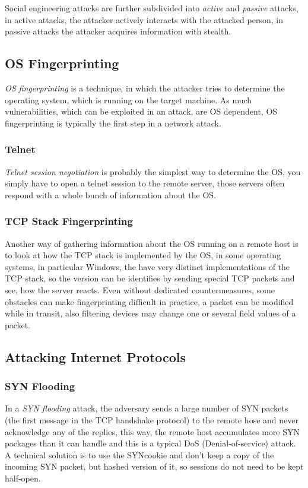 \documentclass[a4paper, 10 pt, conference]{ieeeconf}
\begin{document}
Social engineering attacks are further subdivided into \emph{active } and \emph{passive} attacks, in active attacks, the attacker actively interacts with the attacked person, in passive attacks the attacker acquires information with stealth.
\subsection{\textbf{OS Fingerprinting}}
\emph{OS fingerprinting} is a technique, in which the attacker tries to determine the operating system, which is running on the target machine. As much vulnerabilities, which can be exploited in an attack, are OS dependent, OS fingerprinting is typically the first step in a network attack. 
\vspace{0.5cm}
\subsubsection{\textbf{Telnet}}
\emph{Telnet session negotiation} is probably the simplest way to determine the OS, you simply have to open a telnet session to the remote server, those servers often respond with a whole bunch of information about the OS. 
\vspace{0.5cm}
\subsubsection{\textbf{TCP Stack Fingerprinting}}
Another way of gathering information about the OS running on a remote host is to look at how the TCP stack is implemented by the OS, in some operating systems, in particular Windows, the have very distinct implementations of the TCP stack, so the version can be identifies by sending special TCP packets and see, how the server reacts. Even without dedicated countermeasures, some obstacles can make fingerprinting difficult in practice, a packet can be modified while in transit, also filtering devices may change one or several field values of a packet. 



\subsection{\textbf{Attacking Internet Protocols}}

\subsubsection{\textbf{SYN Flooding}}
In a \emph{SYN flooding} attack, the adversary sends a large number of SYN packets (the first message in the TCP handshake protocol) to the remote hose and never acknowledge any of the replies, this way, the remote host accumulates more SYN packages than it can handle and this is a typical DoS (Denial-of-service) attack. \\
A technical solution is to use the SYNcookie and don't keep a copy of the incoming SYN packet, but hashed version of it, so sessions do not need to be kept half-open.
\vspace{0.5cm}
\end{document}
